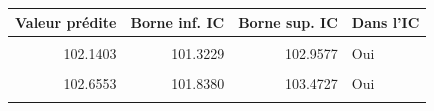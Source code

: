 \centering
\centering
\begin{tabular}[t]{rrrl}
\toprule
Valeur prédite & Borne inf. IC & Borne sup. IC & Dans l'IC\\
\midrule
\cellcolor{gray!10}{102.1631} & \cellcolor{gray!10}{101.3457} & \cellcolor{gray!10}{102.9805} & \cellcolor{gray!10}{Oui}\\
102.1403 & 101.3229 & 102.9577 & Oui\\
\cellcolor{gray!10}{102.0547} & \cellcolor{gray!10}{101.2373} & \cellcolor{gray!10}{102.8721} & \cellcolor{gray!10}{Oui}\\
102.6553 & 101.8380 & 103.4727 & Oui\\
\cellcolor{gray!10}{NA} & \cellcolor{gray!10}{NA} & \cellcolor{gray!10}{NA} & \cellcolor{gray!10}{100\% (4/4)\}}\\
\bottomrule
\end{tabular}

